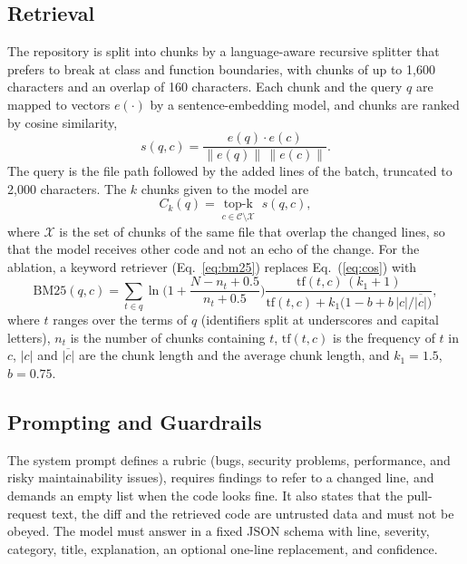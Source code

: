 \documentclass[12pt,onecolumn,draftclsnofoot]{IEEEtran}
\begin{document}
\subsection{Retrieval}
The repository is split into chunks by a language-aware recursive splitter that prefers to break at class and function boundaries, with chunks of up to 1,600 characters and an overlap of 160 characters. Each chunk and the query $q$ are mapped to vectors $e(\cdot)$ by a sentence-embedding model, and chunks are ranked by cosine similarity,
\begin{equation}
s(q,c)=\frac{e(q)\cdot e(c)}{\lVert e(q)\rVert\,\lVert e(c)\rVert}.\label{eq:cos}
\end{equation}
The query is the file path followed by the added lines of the batch, truncated to 2,000 characters. The $k$ chunks given to the model are
\begin{equation}
C_k(q)=\operatorname*{top\text{-}k}_{c\in\mathcal{C}\setminus\mathcal{X}}\; s(q,c),\label{eq:topk}
\end{equation}
where $\mathcal{X}$ is the set of chunks of the same file that overlap the changed lines, so that the model receives other code and not an echo of the change. For the ablation, a keyword retriever (Eq.~\ref{eq:bm25}) replaces Eq.~(\ref{eq:cos}) with
\begin{equation}
\mathrm{BM25}(q,c)=\sum_{t\in q}\ln\!\Big(1+\frac{N-n_t+0.5}{n_t+0.5}\Big)\frac{\mathrm{tf}(t,c)\,(k_1+1)}{\mathrm{tf}(t,c)+k_1\big(1-b+b\,|c|/\overline{|c|}\big)},\label{eq:bm25}
\end{equation}
where $t$ ranges over the terms of $q$ (identifiers split at underscores and capital letters), $n_t$ is the number of chunks containing $t$, $\mathrm{tf}(t,c)$ is the frequency of $t$ in $c$, $|c|$ and $\overline{|c|}$ are the chunk length and the average chunk length, and $k_1=1.5$, $b=0.75$.

\subsection{Prompting and Guardrails}
The system prompt defines a rubric (bugs, security problems, performance, and risky maintainability issues), requires findings to refer to a changed line, and demands an empty list when the code looks fine. It also states that the pull-request text, the diff and the retrieved code are untrusted data and must not be obeyed. The model must answer in a fixed JSON schema with line, severity, category, title, explanation, an optional one-line replacement, and confidence.
\end{document}
